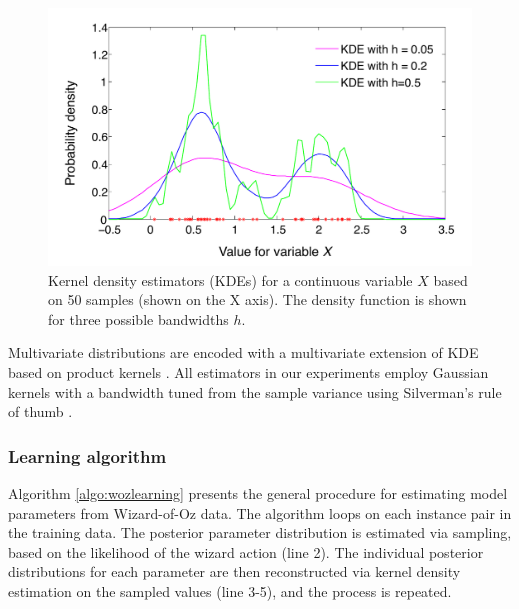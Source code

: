 \begin{figure}[ht]
\centering
\includegraphics[scale=0.45]{imgs/kde.pdf} 
\caption{Kernel density estimators (KDEs) for a continuous variable $X$ based on 50 samples (shown on the X axis). The density function is shown for three possible bandwidths $h$. }
\label{fig:kde}
\end{figure}

Multivariate distributions are encoded with a multivariate extension of KDE based on product kernels \citep{Silverman1986}.  All estimators in our experiments employ Gaussian kernels with a bandwidth tuned from the sample variance using Silverman's rule of thumb \citep{Silverman1986}. 


\subsubsection*{Learning algorithm}

Algorithm \ref{algo:wozlearning} presents the general procedure for estimating model parameters from Wizard-of-Oz data.  The algorithm loops on each instance pair in the training data.   The posterior parameter distribution is estimated via sampling, based on the likelihood of the wizard action (line 2).  The individual posterior distributions for each parameter are then reconstructed via kernel density estimation on the sampled values (line 3-5), and the process is repeated. 


